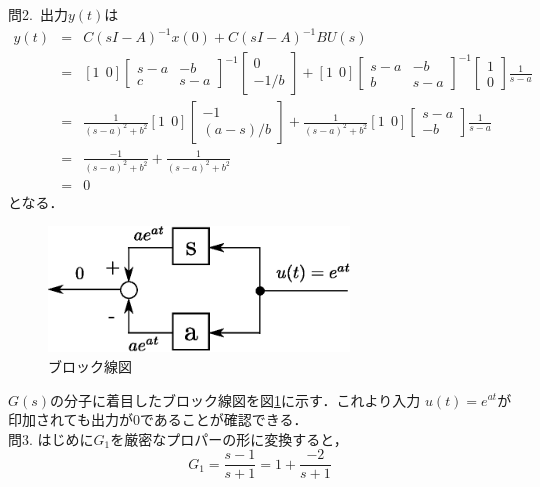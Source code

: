 \documentclass[a4paper,12pt]{jarticle}
\begin{document}
問2.~出力$y(t)$は
\begin{eqnarray}
 y(t)&=&C(sI-A)^{-1}x(0)+C(sI-A)^{-1}BU(s) \nonumber\\
 &=&\left[1~~0\right]
  \left[
\begin{array}{cc}
 s-a &-b\\
 c &s-a
\end{array}
\right]^{-1}\left[
\begin{array}{c}
 0\\
 -1/b
\end{array}
\right]+\left[1~~0\right]
\left[
\begin{array}{cc}
 s-a &-b\\
 b &s-a
\end{array}
\right]^{-1}\left[
\begin{array}{c}
 1\\
 0
\end{array}
\right]\frac{1}{s-a}
\nonumber\\
 &=&
  \frac{1}{(s-a)^2+b^2}
  \left[1~~0\right]\left[
\begin{array}{c}
-1\\
 (a-s)/b 
\end{array}
\right]+ \frac{1}{(s-a)^2+b^2}\left[1~~0\right]
\left[
\begin{array}{cc}
 s-a\\
 -b 
\end{array}
\right]\frac{1}{s-a}\nonumber\\
 &=& \frac{-1}{(s-a)^2+b^2}+ \frac{1}{(s-a)^2+b^2}\nonumber\\
 &=&0
\end{eqnarray}
となる．
%
\begin{figure}[tbp]
 \begin{center}
  \includegraphics[width=80mm]{fig/burokku.eps}
 \end{center}
 \caption{ブロック線図}
 \label{fig:bro}
\end{figure}
%
$G(s)$の分子に着目したブロック線図を図\ref{fig:bro}に示す．これより入力
$u(t)=e^{at}$が印加されても出力が$0$であることが確認できる．
\\
問3.
はじめに$G_1$を厳密なプロパーの形に変換すると，
%
\begin{equation}
 G_1=\frac{s-1}{s+1}=1+\frac{-2}{s+1}
\end{equation}
\end{document}
